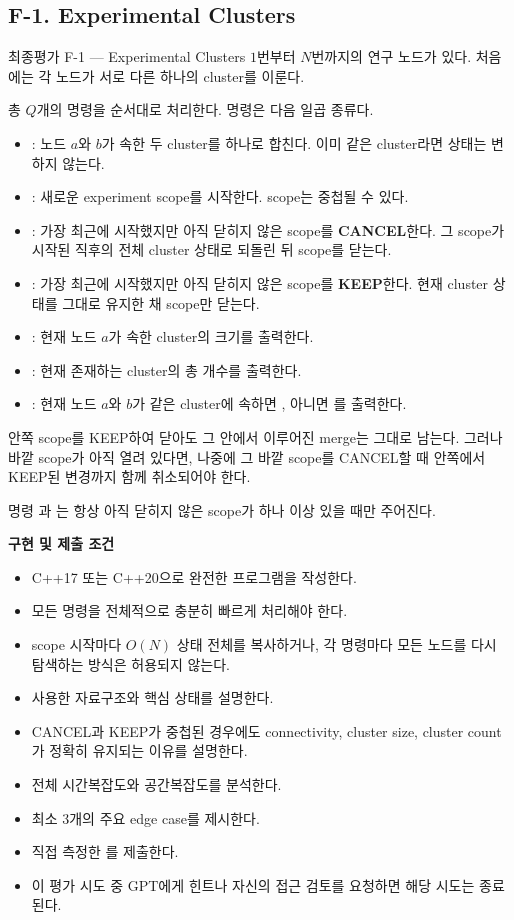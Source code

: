 \subsection{F-1. Experimental Clusters}
\begin{problembox}{최종평가 F-1 --- Experimental Clusters}
$1$번부터 $N$번까지의 연구 노드가 있다. 처음에는 각 노드가 서로 다른 하나의 cluster를 이룬다.

총 $Q$개의 명령을 순서대로 처리한다. 명령은 다음 일곱 종류다.
\begin{itemize}
\item {}: 노드 $a$와 $b$가 속한 두 cluster를 하나로 합친다. 이미 같은 cluster라면 상태는 변하지 않는다.
\item {}: 새로운 experiment scope를 시작한다. scope는 중첩될 수 있다.
\item {}: 가장 최근에 시작했지만 아직 닫히지 않은 scope를 \textbf{CANCEL}한다. 그 scope가 시작된 직후의 전체 cluster 상태로 되돌린 뒤 scope를 닫는다.
\item {}: 가장 최근에 시작했지만 아직 닫히지 않은 scope를 \textbf{KEEP}한다. 현재 cluster 상태를 그대로 유지한 채 scope만 닫는다.
\item {}: 현재 노드 $a$가 속한 cluster의 크기를 출력한다.
\item {}: 현재 존재하는 cluster의 총 개수를 출력한다.
\item {}: 현재 노드 $a$와 $b$가 같은 cluster에 속하면 , 아니면 를 출력한다.
\end{itemize}

안쪽 scope를 KEEP하여 닫아도 그 안에서 이루어진 merge는 그대로 남는다. 그러나 바깥 scope가 아직 열려 있다면, 나중에 그 바깥 scope를 CANCEL할 때 안쪽에서 KEEP된 변경까지 함께 취소되어야 한다.

명령 과 는 항상 아직 닫히지 않은 scope가 하나 이상 있을 때만 주어진다.

\textbf{구현 및 제출 조건}
\begin{itemize}
\item C++17 또는 C++20으로 완전한 프로그램을 작성한다.
\item 모든 명령을 전체적으로 충분히 빠르게 처리해야 한다.
\item scope 시작마다 $O(N)$ 상태 전체를 복사하거나, 각 명령마다 모든 노드를 다시 탐색하는 방식은 허용되지 않는다.
\item 사용한 자료구조와 핵심 상태를 설명한다.
\item CANCEL과 KEEP가 중첩된 경우에도 connectivity, cluster size, cluster count가 정확히 유지되는 이유를 설명한다.
\item 전체 시간복잡도와 공간복잡도를 분석한다.
\item 최소 3개의 주요 edge case를 제시한다.
\item 직접 측정한 를 제출한다.
\item 이 평가 시도 중 GPT에게 힌트나 자신의 접근 검토를 요청하면 해당 시도는 종료된다.
\end{itemize}


\end{problembox}

